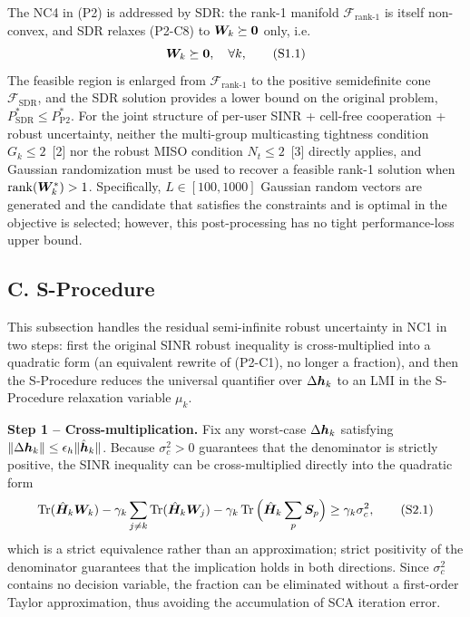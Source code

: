 The NC4 in (P2) is addressed by SDR: the rank-1 manifold $\mathcal{F}_{\text{rank-1}}$ is itself non-convex, and SDR relaxes (P2-C8) to $\bm{W}_k \succeq \bm{0}$ only, i.e.
\begin{equation}
\bm{W}_k \succeq \bm{0}, \quad \forall k, \tag{S1.1}
\end{equation}
The feasible region is enlarged from $\mathcal{F}_{\text{rank-1}}$ to the positive semidefinite cone $\mathcal{F}_{\text{SDR}}$, and the SDR solution provides a lower bound on the original problem, $P_{\text{SDR}}^* \leq P_{\text{P2}}^*$. For the joint structure of per-user SINR + cell-free cooperation + robust uncertainty, neither the multi-group multicasting tightness condition $G_k \leq 2$~[2] nor the robust MISO condition $N_t \leq 2$~[3] directly applies, and Gaussian randomization must be used to recover a feasible rank-1 solution when $\operatorname{rank}(\bm{W}_k^*) > 1$. Specifically, $L \in [100, 1000]$ Gaussian random vectors are generated and the candidate that satisfies the constraints and is optimal in the objective is selected; however, this post-processing has no tight performance-loss upper bound.

\subsection*{C. S-Procedure}

This subsection handles the residual semi-infinite robust uncertainty in NC1 in two steps: first the original SINR robust inequality is cross-multiplied into a quadratic form (an equivalent rewrite of (P2-C1), no longer a fraction), and then the S-Procedure reduces the universal quantifier over $\Delta\bm{h}_k$ to an LMI in the S-Procedure relaxation variable $\mu_k$.

\textbf{Step 1 -- Cross-multiplication.} Fix any worst-case $\Delta\bm{h}_k$ satisfying $\|\Delta\bm{h}_k\| \leq \epsilon_h \|\hat{\bm{h}}_k\|$. Because $\sigma_c^2 > 0$ guarantees that the denominator is strictly positive, the SINR inequality can be cross-multiplied directly into the quadratic form
\begin{equation}
\operatorname{Tr}(\hat{\bm{H}}_k \bm{W}_k) - \gamma_k \sum_{j \neq k} \operatorname{Tr}(\hat{\bm{H}}_k \bm{W}_j) - \gamma_k \operatorname{Tr}\Big(\hat{\bm{H}}_k \sum_p \bm{S}_p\Big) \geq \gamma_k \sigma_c^2, \tag{S2.1}
\end{equation}
which is a strict equivalence rather than an approximation; strict positivity of the denominator guarantees that the implication holds in both directions. Since $\sigma_c^2$ contains no decision variable, the fraction can be eliminated without a first-order Taylor approximation, thus avoiding the accumulation of SCA iteration error.

